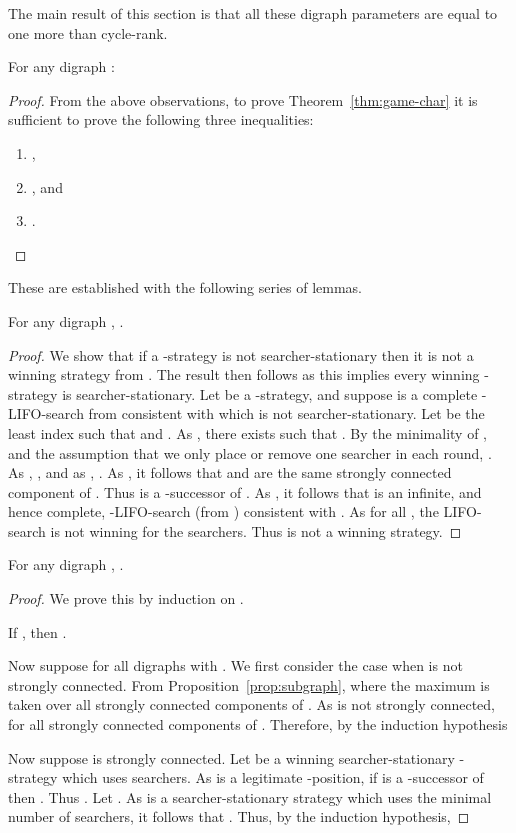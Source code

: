\documentclass{llncs}
\begin{document}
The main result of this section is that all these digraph parameters are equal to one more than cycle-rank.
\begin{theorem}\label{thm:game-char}
For any digraph :

\end{theorem}
\begin{proof}
From the above observations, to prove Theorem~\ref{thm:game-char} it is sufficient to prove the following three inequalities:
\begin{enumerate}[(1) ]
\item ,
\item , and
\item .
\end{enumerate}
\end{proof}
These are established with the following series of lemmas.
\begin{lemma}  
For any digraph , .
\end{lemma}
\begin{proof}
We show that if a -strategy is not searcher-stationary then it is not a winning strategy from .  The result then follows as this implies every winning -strategy is searcher-stationary.
Let  be a -strategy, and suppose  is a complete -LIFO-search from  consistent with  which is not searcher-stationary.  
Let  be the least index such that  and .  As , there exists  such that .  By the minimality of , and the assumption that we only place or remove one searcher in each round, .   As , , and as , .  As , it follows that  and  are the same strongly connected component of .  Thus  is a -successor of .  As , it follows that  is an infinite, and hence complete,  -LIFO-search (from ) consistent with .  As  for all , the LIFO-search is not winning for the searchers.  Thus  is not a winning strategy.
\end{proof}

\begin{lemma}  
For any digraph , .
\end{lemma}
\begin{proof}
We prove this by induction on .

If , then . 

Now suppose  for all digraphs  with .
We first consider the case when  is not strongly connected.  From Proposition~\ref{prop:subgraph},  where the maximum is taken over all strongly connected components  of .  As  is not strongly connected,  for all strongly connected components  of .  Therefore, by the induction hypothesis

Now suppose  is strongly connected.  Let  be a winning searcher-stationary -strategy which uses  searchers.  As  is a legitimate -position, if  is a  -successor of  then .  Thus .  Let .  As  is a searcher-stationary strategy which uses the minimal number of searchers, it follows that .  Thus, by the induction hypothesis,

\end{proof}
\end{document}
